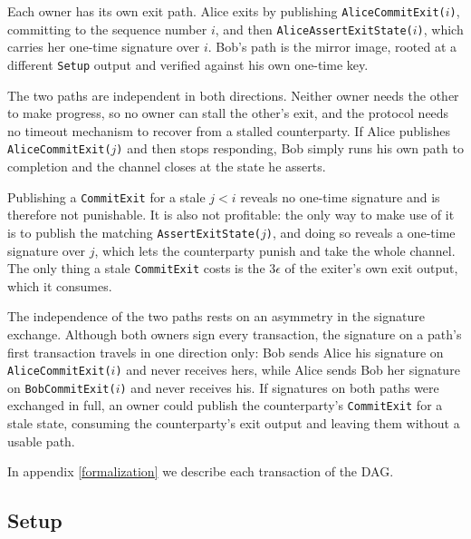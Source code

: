 \documentclass[11pt,a4paper]{article}
\newcommand{\txname}[1]{\texttt{#1}}
\begin{document}
Each owner has its own exit path. Alice exits by publishing \txname{AliceCommitExit($i$)}, committing to the sequence number $i$, and then \txname{AliceAssertExitState($i$)}, which carries her one-time signature over $i$. Bob's path is the mirror image, rooted at a different \txname{Setup} output and verified against his own one-time key.

The two paths are independent in both directions. Neither owner needs the other to make progress, so no owner can stall the other's exit, and the protocol needs no timeout mechanism to recover from a stalled counterparty. If Alice publishes \txname{AliceCommitExit($j$)} and then stops responding, Bob simply runs his own path to completion and the channel closes at the state he asserts.

Publishing a \txname{CommitExit} for a stale $j < i$ reveals no one-time signature and is therefore not punishable. It is also not profitable: the only way to make use of it is to publish the matching \txname{AssertExitState($j$)}, and doing so reveals a one-time signature over $j$, which lets the counterparty punish and take the whole channel. The only thing a stale \txname{CommitExit} costs is the $3\epsilon$ of the exiter's own exit output, which it consumes.

The independence of the two paths rests on an asymmetry in the signature exchange. Although both owners sign every transaction, the signature on a path's first transaction travels in one direction only: Bob sends Alice his signature on \txname{AliceCommitExit($i$)} and never receives hers, while Alice sends Bob her signature on \txname{BobCommitExit($i$)} and never receives his. If signatures on both paths were exchanged in full, an owner could publish the counterparty's \txname{CommitExit} for a stale state, consuming the counterparty's exit output and leaving them without a usable path.

In appendix \ref{formalization} we describe each transaction of the DAG.

\subsection{Setup}
\end{document}
